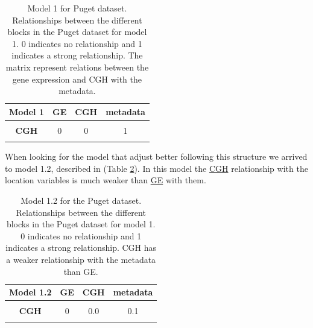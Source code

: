 \documentclass[
  12pt,
  a4paper,
  twoside,
  openright]{book}
\begin{document}
\begin{table}[H]

\caption[Model 1 for the Puget dataset.]{\label{tab:puget-model1}Model 1 for Puget dataset. Relationships between the different blocks in the Puget dataset for model 1. 0 indicates no relationship and 1 indicates a strong relationship. The matrix represent relations between the gene expression and CGH with the metadata.}
\centering
\begin{tabular}[t]{>{}c|c|c|c}
\hline
\textbf{Model 1} & \textbf{GE} & \textbf{CGH} & \textbf{metadata}\\
\hline
\textbf{\cellcolor{gray!6}{GE}} & \cellcolor{gray!6}{0} & \cellcolor{gray!6}{0} & \cellcolor{gray!6}{1}\\
\hline
\textbf{CGH} & 0 & 0 & 1\\
\hline
\textbf{\cellcolor{gray!6}{metadata}} & \cellcolor{gray!6}{1} & \cellcolor{gray!6}{1} & \cellcolor{gray!6}{0}\\
\hline
\end{tabular}
\end{table}

When looking for the model that adjust better following this structure we arrived to model 1.2, described in (Table \ref{tab:puget-model1-2}).
In this model the \protect\hyperlink{acronyms_CGH}{CGH} relationship with the location variables is much weaker than \protect\hyperlink{acronyms_GE}{GE} with them.

\begin{table}[H]

\caption[Model 1.2 for the Puget dataset.]{\label{tab:puget-model1-2}Model 1.2 for the Puget dataset. Relationships between the different blocks in the Puget dataset for model 1. 0 indicates no relationship and 1 indicates a strong relationship. CGH has a weaker relationship with the metadata than GE. }
\centering
\begin{tabular}[t]{>{}c|c|c|c}
\hline
\textbf{Model 1.2} & \textbf{GE} & \textbf{CGH} & \textbf{metadata}\\
\hline
\textbf{\cellcolor{gray!6}{GE}} & \cellcolor{gray!6}{0} & \cellcolor{gray!6}{0.0} & \cellcolor{gray!6}{1.0}\\
\hline
\textbf{CGH} & 0 & 0.0 & 0.1\\
\hline
\textbf{\cellcolor{gray!6}{metadata}} & \cellcolor{gray!6}{1} & \cellcolor{gray!6}{0.1} & \cellcolor{gray!6}{0.0}\\
\hline
\end{tabular}
\end{table}
\end{document}
